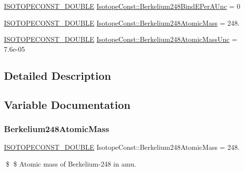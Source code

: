 \begin{DoxyCompactItemize}
\mbox{\hyperlink{group___isotope_const-_macros_ga8f45a7272ce02c0b4c65c44636ed719a}{I\+S\+O\+T\+O\+P\+E\+C\+O\+N\+S\+T\+\_\+\+D\+O\+U\+B\+LE}} \mbox{\hyperlink{group___isotope_const-_berkelium-_bk248_ga07a414211596fa5cb359446d0a2ee0be}{Isotope\+Const\+::\+Berkelium248\+Bind\+E\+Per\+A\+Unc}} = 0
\item 
\mbox{\hyperlink{group___isotope_const-_macros_ga8f45a7272ce02c0b4c65c44636ed719a}{I\+S\+O\+T\+O\+P\+E\+C\+O\+N\+S\+T\+\_\+\+D\+O\+U\+B\+LE}} \mbox{\hyperlink{group___isotope_const-_berkelium-_bk248_gaa1e69110016c90576bcb3414c474755f}{Isotope\+Const\+::\+Berkelium248\+Atomic\+Mass}} = 248.
\item 
\mbox{\hyperlink{group___isotope_const-_macros_ga8f45a7272ce02c0b4c65c44636ed719a}{I\+S\+O\+T\+O\+P\+E\+C\+O\+N\+S\+T\+\_\+\+D\+O\+U\+B\+LE}} \mbox{\hyperlink{group___isotope_const-_berkelium-_bk248_ga4e7e40ef34a3a9bcc9f7ce2ebf2e7d72}{Isotope\+Const\+::\+Berkelium248\+Atomic\+Mass\+Unc}} = 7.\+6e-\/05
\end{DoxyCompactItemize}


\subsection{Detailed Description}


\subsection{Variable Documentation}
\mbox{\label{group___isotope_const-_berkelium-_bk248_gaa1e69110016c90576bcb3414c474755f}} 
\subsubsection{\texorpdfstring{Berkelium248\+Atomic\+Mass}{Berkelium248AtomicMass}}
{\footnotesize\ttfamily \mbox{\hyperlink{group___isotope_const-_macros_ga8f45a7272ce02c0b4c65c44636ed719a}{I\+S\+O\+T\+O\+P\+E\+C\+O\+N\+S\+T\+\_\+\+D\+O\+U\+B\+LE}} Isotope\+Const\+::\+Berkelium248\+Atomic\+Mass = 248.}

\$ \$ Atomic mass of Berkelium-\/248 in amu. \mbox{\label{group___isotope_const-_berkelium-_bk248_ga4e7e40ef34a3a9bcc9f7ce2ebf2e7d72}} 
